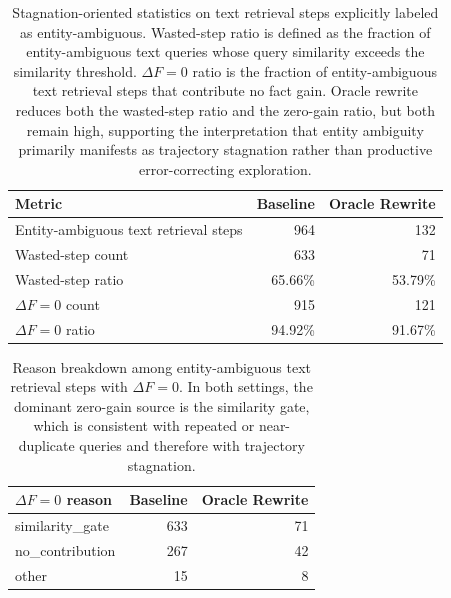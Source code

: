\begin{table}[t]
\centering
\small
\setlength{\tabcolsep}{6pt}
\begin{tabular}{lrr}
\hline
Metric & Baseline & Oracle Rewrite \\
\hline
Entity-ambiguous text retrieval steps & 964 & 132 \\
Wasted-step count & 633 & 71 \\
Wasted-step ratio & 65.66\% & 53.79\% \\
$\Delta F = 0$ count & 915 & 121 \\
$\Delta F = 0$ ratio & 94.92\% & 91.67\% \\
\hline
\end{tabular}
\caption{Stagnation-oriented statistics on text retrieval steps explicitly labeled as entity-ambiguous. Wasted-step ratio is defined as the fraction of entity-ambiguous text queries whose query similarity exceeds the similarity threshold. $\Delta F = 0$ ratio is the fraction of entity-ambiguous text retrieval steps that contribute no fact gain. Oracle rewrite reduces both the wasted-step ratio and the zero-gain ratio, but both remain high, supporting the interpretation that entity ambiguity primarily manifests as trajectory stagnation rather than productive error-correcting exploration.}
\label{tab:entity-ambiguity-stagnation}
\end{table}

\begin{table}[t]
\centering
\small
\setlength{\tabcolsep}{6pt}
\begin{tabular}{lrr}
\hline
$\Delta F = 0$ reason & Baseline & Oracle Rewrite \\
\hline
similarity\_gate & 633 & 71 \\
no\_contribution & 267 & 42 \\
other & 15 & 8 \\
\hline
\end{tabular}
\caption{Reason breakdown among entity-ambiguous text retrieval steps with $\Delta F = 0$. In both settings, the dominant zero-gain source is the similarity gate, which is consistent with repeated or near-duplicate queries and therefore with trajectory stagnation.}
\label{tab:entity-ambiguity-stagnation-breakdown}
\end{table}
